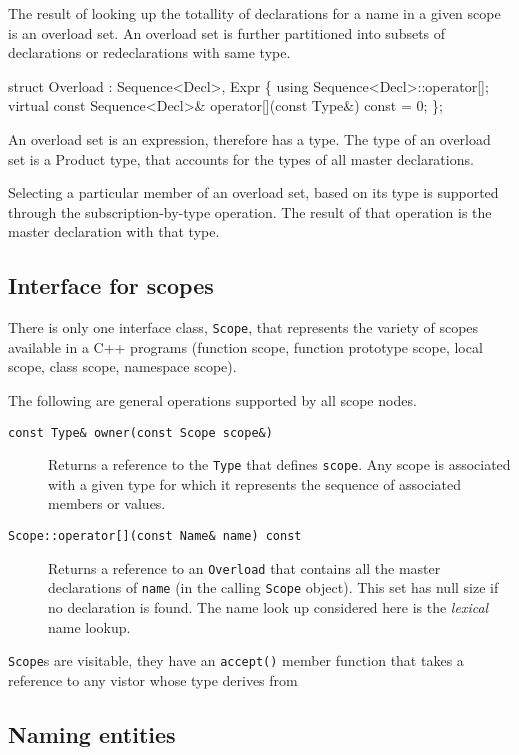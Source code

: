 \documentclass[letter,11pt]{article}
\begin{document}
The result of looking up the totallity of declarations for a name in a given
scope is an overload set.  An overload set is further partitioned into subsets
of declarations or redeclarations with same type.
\begin{Program}
   struct Overload : Sequence<Decl>, Expr \{
      using Sequence<Decl>::operator[];
      virtual const Sequence<Decl>& operator[](const Type&) const = 0;
   \};
\end{Program}
An overload set is an expression, therefore has a type.  The type of an
overload set is a Product type, that accounts for the types of all master
declarations.  

Selecting a particular member of an overload set, based on its type is
supported through the subscription-by-type operation.  The result of that
operation is the master declaration with that type. 

\subsection{Interface for scopes}
\label{sec:interface:scope}

There is only one interface class, \texttt{Scope}, that represents the variety
of scopes available in a C++ programs (function scope, function prototype
scope, local scope, class scope, namespace scope). 


The following are general operations supported by all scope nodes.
\begin{description}
\item[\texttt{const Type\& owner(const Scope scope\&)}]
  Returns a \const{} reference to the \texttt{Type} that defines
  \texttt{scope}.  Any scope is  associated with a given type for which it
  represents the sequence of associated members or values.

\item[\texttt{Scope::operator[](const Name\& name) const}] 
  Returns a \const{} reference to an \texttt{Overload} that contains all
  the master declarations of \texttt{name} (in the calling \texttt{Scope}
  object). 
  This set has null size if no declaration is found. The name look up
  considered here is the \emph{lexical} name lookup. 
\end{description}

\texttt{Scope}s are visitable, they have an \texttt{accept()} member function
that takes a reference to any vistor whose type derives from

\subsection{Naming entities}
\end{document}
